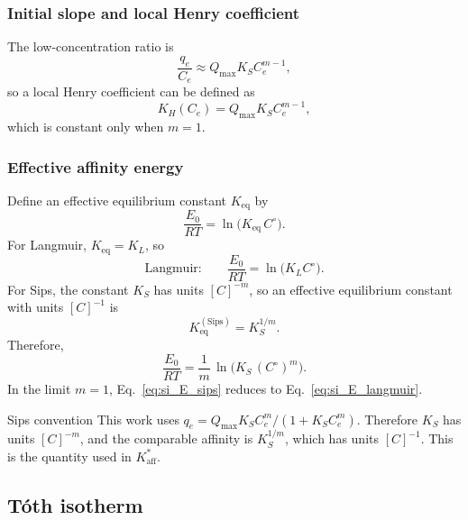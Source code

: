 \documentclass[journal=jacsat,manuscript=article]{achemso}
\begin{document}
\subsubsection{Initial slope and local Henry coefficient}

The low-concentration ratio is
\begin{equation}
	\frac{q_e}{C_e}
	\approx Q_{\max} K_S C_e^{m-1},
\end{equation}
so a local Henry coefficient can be defined as
\begin{equation}
	K_H(C_e) = Q_{\max} K_S C_e^{m - 1},
\end{equation}
which is constant only when \(m = 1\).

\subsubsection{Effective affinity energy}

Define an effective equilibrium constant \(K_{\mathrm{eq}}\) by
\begin{equation}
	\frac{E_0}{RT} = \ln\!\big(K_{\mathrm{eq}}\,C^\circ\big).
	\label{eq:si_E_def}
\end{equation}
For Langmuir, \(K_{\mathrm{eq}} = K_L\), so
\begin{equation}
	\text{Langmuir:}\qquad
	\frac{E_0}{RT} = \ln\!\big(K_L C^\circ\big).
	\label{eq:si_E_langmuir}
\end{equation}
For Sips, the constant \(K_S\) has units \([C]^{-m}\), so an effective
equilibrium constant with units \([C]^{-1}\) is
\begin{equation}
	K_{\mathrm{eq}}^{\mathrm{(Sips)}} = K_S^{1/m}.
\end{equation}
Therefore,
\begin{equation}
	\frac{E_0}{RT}
	= \frac{1}{m}\,\ln\!\big(K_S\,(C^\circ)^{m}\big).
	\label{eq:si_E_sips}
\end{equation}
In the limit \(m = 1\), Eq.~\eqref{eq:si_E_sips} reduces to
Eq.~\eqref{eq:si_E_langmuir}.

\begin{bluebox}{Sips convention}
	This work uses \(q_e=Q_{\max}K_S C_e^m/(1+K_S C_e^m)\). Therefore
	\(K_S\) has units \([C]^{-m}\), and the comparable affinity is
	\(K_S^{1/m}\), which has units \([C]^{-1}\). This is the quantity used
	in \(K_{\mathrm{aff}}^{\ast}\).
\end{bluebox}

\subsection{T\'{o}th isotherm}
\label{sec:si_toth}
\end{document}
